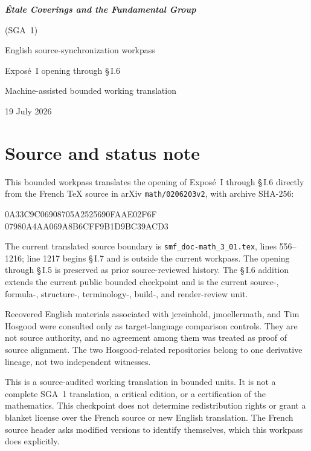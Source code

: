 \documentclass[11pt,oneside]{amsbook}
\begin{document}
\frontmatter
\begin{titlepage}
  \centering
  \vspace*{35mm}
  {\Huge\bfseries \textit{Étale Coverings and the Fundamental Group}\par}
  \vspace{3mm}
  {\LARGE (SGA~1)\par}
  \vspace{20mm}
  {\Large English source-synchronization workpass\par}
  \vspace{3mm}
  {\Large Exposé~I opening through \S\,I.6\par}
  \vfill
  {\large Machine-assisted bounded working translation\par}
  \vspace{5mm}
  {\large 19 July 2026\par}
\end{titlepage}

\chapter*{Source and status note}

This bounded workpass translates the opening of Exposé~I through \S\,I.6 directly
from the French \TeX{} source in arXiv \texttt{math/0206203v2}, with archive
SHA-256:
\begin{center}
  \small\ttfamily
  0A33C9C06908705A2525690FAAE02F6F\\
  07980A4AA069A8B6CFF9B1D9BC39ACD3
\end{center}
The current translated source boundary is
\texttt{smf\_doc-math\_3\_01.tex}, lines 556--1216; line 1217 begins \S\,I.7
and is outside the current workpass.  The opening through \S\,I.5 is preserved as prior source-reviewed history.
The \S\,I.6 addition extends the current public bounded checkpoint and is the
current source-, formula-, structure-, terminology-, build-, and render-review
unit.

Recovered English materials associated with jcreinhold, jmoellermath, and
Tim Hosgood were consulted only as target-language comparison controls.
They are not source authority, and no agreement among them was treated as
proof of source alignment.  The two Hosgood-related repositories belong to
one derivative lineage, not two independent witnesses.

This is a source-audited working translation in bounded units.  It is not
a complete SGA~1 translation, a critical edition, or a certification of the
mathematics.  This checkpoint does not determine redistribution rights or grant a blanket
license over the French source or new English translation.  The French source
header asks modified versions to identify themselves, which this workpass does
explicitly.
\end{document}
